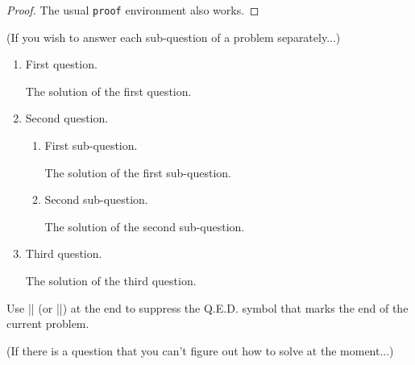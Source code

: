 \documentclass[11pt,
  logo = {example-image},
  title in boldface,
  theorem in new line,
]{homework}
\begin{document}
\begin{proof}
    The usual \verb|proof| environment also works.
\end{proof}


\bigskip\textcolor{gray!55}{(If you wish to answer each sub-question of a problem separately...)}

\begin{problem}
    \begin{enumerate}[itemsep=.5\baselineskip]
        \item First question.

        \begin{solution}
            The solution of the first question.
        \end{solution}

        \item Second question.

        \begin{enumerate}[itemsep=.3\baselineskip]
            \item First sub-question.

            \begin{solution}
                The solution of the first sub-question.
            \end{solution}

            \item Second sub-question.

            \begin{solution}
                The solution of the second sub-question.
            \end{solution}

        \end{enumerate}

        \item Third question.

        \begin{solution}
            The solution of the third question.
        \end{solution}

    \end{enumerate}
    Use \cverb|\noqed| (or \cverb|\noQED|) at the end to suppress the Q.E.D. symbol that marks the end of the current problem.
    \noQED
\end{problem}


\bigskip\textcolor{gray!55}{(If there is a question that you can't figure out how to solve at the moment...)}

\end{document}

